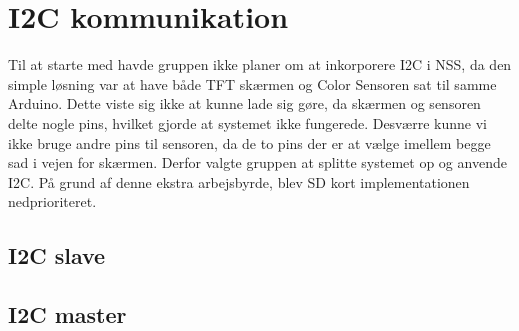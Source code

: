 \graphicspath{{Chapters/Test/}}


\section{I2C kommunikation}
Til at starte med havde gruppen ikke planer om at inkorporere I2C i NSS, da den simple løsning var at have både TFT skærmen og Color Sensoren sat til samme Arduino. Dette viste sig ikke at kunne lade sig gøre, da skærmen og sensoren delte nogle pins, hvilket gjorde at systemet ikke fungerede. Desværre kunne vi ikke bruge andre pins til sensoren, da de to pins der er at vælge imellem begge sad i vejen for skærmen. Derfor valgte gruppen at splitte systemet op og anvende I2C. På grund af denne ekstra arbejsbyrde, blev SD kort implementationen nedprioriteret.

\subsection{I2C slave}



\subsection{I2C master}